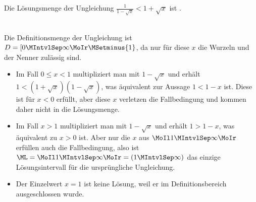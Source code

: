 \begin{MExercises}
\begin{MExercise}
Die Lösungsmenge der Ungleichung $\frac1{1-\sqrt{x}}<1+\sqrt{x}$ ist .
\ \\ \ \\
\begin{MHint}{\iSolution}
Die Definitionsmenge der Ungleichung ist $D=[0\MIntvlSep \infty\MoIr\MSetminus \lbrace 1\rbrace$,
da nur für diese $x$ die Wurzeln und der Nenner zulässig sind.
\begin{itemize}
\item{Im Fall $0\leq x<1$ multipliziert man mit $1-\sqrt{x}$ und erhält $1<(1+\sqrt{x})(1-\sqrt{x})$, was äquivalent zur Aussage $1<1-x$ ist. Diese ist für $x<0$ erfüllt, aber diese $x$ verletzen die Fallbedingung und kommen daher nicht in die Lösungsmenge.}
\item{Im Fall $x>1$ multipliziert man mit $1-\sqrt{x}$ und erhält $1>1-x$, was äquivalent zu $x>0$ ist. Aber nur die $x$ aus $\MoIl 1\MIntvlSep \infty\MoIr$ erfüllen auch die Fallbedingung, also ist $\ML=\MoIl 1\MIntvlSep \infty\MoIr=( 1\MIntvlSep \infty)$ das einzige Lösungsintervall für die ursprüngliche Ungleichung.}
\item{Der Einzelwert $x=1$ ist keine Lösung, weil er im Definitionsbereich ausgeschlossen wurde.}
\end{itemize}
\end{MHint}
\end{MExercise}


\end{MExercises}


